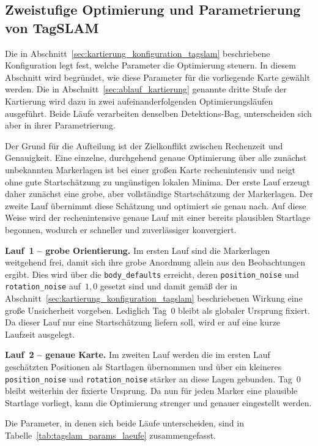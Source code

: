 \subsection{Zweistufige Optimierung und Parametrierung von TagSLAM}
\label{sec:parametrierung_tagslam}
Die in Abschnitt~\ref{sec:kartierung_konfiguration_tagslam} beschriebene Konfiguration legt fest, welche Parameter die Optimierung steuern.
In diesem Abschnitt wird begründet, wie diese Parameter für die vorliegende Karte gewählt werden.
Die in Abschnitt~\ref{sec:ablauf_kartierung} genannte dritte Stufe der Kartierung wird dazu in zwei aufeinanderfolgenden Optimierungsläufen ausgeführt.
Beide Läufe verarbeiten denselben Detektions-Bag, unterscheiden sich aber in ihrer Parametrierung.

Der Grund für die Aufteilung ist der Zielkonflikt zwischen Rechenzeit und Genauigkeit.
Eine einzelne, durchgehend genaue Optimierung über alle zunächst unbekannten Markerlagen ist bei einer großen Karte rechenintensiv und neigt ohne gute Startschätzung zu ungünstigen lokalen Minima.
Der erste Lauf erzeugt daher zunächst eine grobe, aber vollständige Startschätzung der Markerlagen.
Der zweite Lauf übernimmt diese Schätzung und optimiert sie genau nach.
Auf diese Weise wird der rechenintensive genaue Lauf mit einer bereits plausiblen Startlage begonnen, wodurch er schneller und zuverlässiger konvergiert.

\textbf{Lauf~1 -- grobe Orientierung.}
Im ersten Lauf sind die Markerlagen weitgehend frei, damit sich ihre grobe Anordnung allein aus den Beobachtungen ergibt.
Dies wird über die \texttt{body\_defaults} erreicht, deren \texttt{position\_noise} und \texttt{rotation\_noise} auf~$1{,}0$ gesetzt sind und damit gemäß der in Abschnitt~\ref{sec:kartierung_konfiguration_tagslam} beschriebenen Wirkung eine große Unsicherheit vorgeben.
Lediglich Tag~0 bleibt als globaler Ursprung fixiert.
Da dieser Lauf nur eine Startschätzung liefern soll, wird er auf eine kurze Laufzeit ausgelegt.

\textbf{Lauf~2 -- genaue Karte.}
Im zweiten Lauf werden die im ersten Lauf geschätzten Positionen als Startlagen übernommen und über ein kleineres \texttt{position\_noise} und \texttt{rotation\_noise} stärker an diese Lagen gebunden.
Tag~0 bleibt weiterhin der fixierte Ursprung.
Da nun für jeden Marker eine plausible Startlage vorliegt, kann die Optimierung strenger und genauer eingestellt werden.

Die Parameter, in denen sich beide Läufe unterscheiden, sind in Tabelle~\ref{tab:tagslam_params_laeufe} zusammengefasst.

